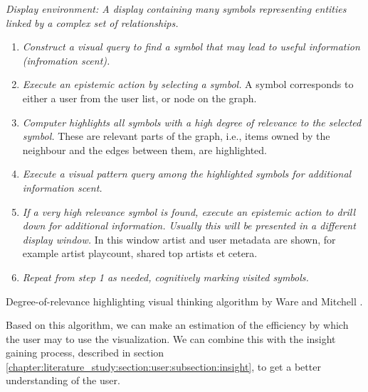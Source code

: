 \begin{table}
	\textit{Display environment: A display containing many symbols representing entities linked by a complex set of relationships.}

	\begin{enumerate}
		\item \textit{Construct a visual query to find a symbol that may lead to useful information (infromation scent).}
		\item \textit{Execute an epistemic action by selecting a symbol.} A symbol corresponds to either a user from the user list, or node on the graph.
		\item \textit{Computer highlights all symbols with a high degree of relevance to the selected symbol.} These are relevant parts of the graph, i.e., items owned by the neighbour and the edges between them, are highlighted.
		\item \textit{Execute a visual pattern query among the highlighted symbols for additional information scent.}
		\item \textit{If a very high relevance symbol is found, execute an epistemic action to drill down for additional information. Usually this will be presented in a different display window.} In this window artist and user metadata are shown, for example artist playcount, shared top artists et cetera.
		\item \textit{Repeat from step 1 as needed, cognitively marking visited symbols.}
	\end{enumerate}
\caption{Degree-of-relevance highlighting visual thinking algorithm by Ware and Mitchell \cite{ware:2004}.}
\label{table:visual_thinking_algorithm}
\end{table}

Based on this algorithm, we can make an estimation of the efficiency by which the user may to use the visualization. We can combine this with the insight gaining process, described in section \ref{chapter:literature_study:section:user:subsection:insight}, to get a better understanding of the user.



